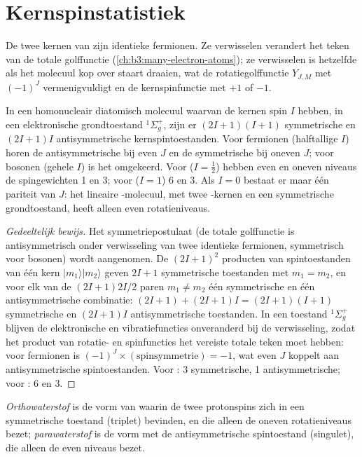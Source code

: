 \section{Kernspinstatistiek}

De twee kernen van  zijn identieke fermionen. Ze verwisselen
verandert het teken van de totale golffunctie
(\cref{ch:b3:many-electron-atoms}); ze verwisselen is hetzelfde als het
molecuul kop over staart draaien, wat de rotatiegolffunctie $Y_{J,M}$ met
$(-1)^J$ vermenigvuldigt en de kernspinfunctie met $+1$ of $-1$.

\begin{theorem}[Kernspinstatistiek]\label{thm:b3:statistical-thermo-applied:spin-statistics}
In een homonucleair diatomisch molecuul waarvan de kernen spin $I$ hebben,
in een elektronische grondtoestand ${}^1\Sigma_g^+$, zijn er $(2I+1)(I+1)$
symmetrische en $(2I+1)I$ antisymmetrische kernspintoestanden. Voor
fermionen (halftallige $I$) horen de antisymmetrische bij even $J$ en de
symmetrische bij oneven $J$; voor bosonen (gehele $I$) is het omgekeerd.
Voor  ($I = \frac12$) hebben even en oneven niveaus de spingewichten
1 en 3; voor  ($I = 1$) 6 en 3. Als $I = 0$ bestaat er maar één
pariteit van $J$: het lineaire -molecuul, met twee
-kernen en een symmetrische grondtoestand, heeft alleen even
rotatieniveaus.
\end{theorem}

\begin{proof}[Gedeeltelijk bewijs]
Het symmetriepostulaat (de totale golffunctie is antisymmetrisch onder
verwisseling van twee identieke fermionen, symmetrisch voor bosonen) wordt
aangenomen. De $(2I+1)^2$ producten van spintoestanden van één kern
$|m_1\rangle|m_2\rangle$ geven $2I+1$ symmetrische toestanden met $m_1 = m_2$,
en voor elk van de $(2I+1)2I/2$ paren $m_1 \ne m_2$ één symmetrische en één
antisymmetrische combinatie: $(2I+1) + (2I+1)I = (2I+1)(I+1)$
symmetrische en $(2I+1)I$ antisymmetrische toestanden. In een toestand
${}^1\Sigma_g^+$ blijven de elektronische en vibratiefuncties onveranderd
bij de verwisseling, zodat het product van rotatie- en spinfuncties het
vereiste totale teken moet hebben: voor fermionen is
$(-1)^J \times(\text{spinsymmetrie}) = -1$, wat even $J$ koppelt aan
antisymmetrische spintoestanden. Voor : 3 symmetrische, 1
antisymmetrische; voor : 6 en
3.
\end{proof}

\begin{definition}\label{def:b3:statistical-thermo-applied:spin-isomers}
\emph{Orthowaterstof} is de vorm van  waarin de
twee protonspins zich in een symmetrische toestand (triplet) bevinden, en
die alleen de oneven rotatieniveaus bezet;
\emph{parawaterstof} is de vorm met de
antisymmetrische spintoestand (singulet), die alleen de even niveaus bezet.
\end{definition}

